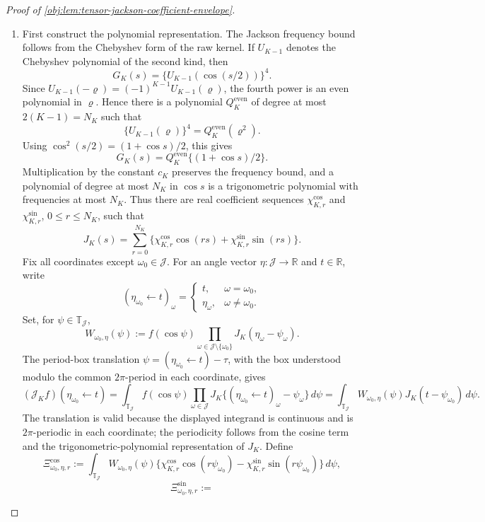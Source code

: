 \begin{proof}[Proof of \cref{obj:lem:tensor-jackson-coefficient-envelope}]
\begin{enumerate}
\item
First construct the polynomial representation.  The Jackson frequency bound follows from the Chebyshev form of the raw kernel.  If \(U_{K-1}\) denotes the Chebyshev polynomial of the second kind, then
\[
G_K(s)=\{U_{K-1}(\cos(s/2))\}^{4}.
\]
Since \(U_{K-1}(-\varrho)=(-1)^{K-1}U_{K-1}(\varrho)\), the fourth power is an even polynomial in \(\varrho\).  Hence there is a polynomial \(Q_K^{\mathrm{even}}\) of degree at most \(2(K-1)=N_K\) such that
\[
\{U_{K-1}(\varrho)\}^{4}=Q_K^{\mathrm{even}}(\varrho^2).
\]
Using \(\cos^2(s/2)=(1+\cos s)/2\), this gives
\[
G_K(s)=Q_K^{\mathrm{even}}\{(1+\cos s)/2\}.
\]
Multiplication by the constant \(c_K\) preserves the frequency bound, and a polynomial of degree at most \(N_K\) in \(\cos s\) is a trigonometric polynomial with frequencies at most \(N_K\).  Thus there are real coefficient sequences \(\chi^{\cos}_{K,r}\) and \(\chi^{\sin}_{K,r}\), \(0\le r\le N_K\), such that
\[
J_K(s)=\sum_{r=0}^{N_K}
\{\chi^{\cos}_{K,r}\cos(rs)+\chi^{\sin}_{K,r}\sin(rs)\}.
\]
Fix all coordinates except \(\omega_0\in\mathcal J\).  For an angle vector \(\eta:\mathcal J\to\mathbb R\) and \(t\in\mathbb R\), write
\[
(\eta_{\omega_0}\leftarrow t)_\omega
=
\begin{cases}
t,&\omega=\omega_0,\\
\eta_\omega,&\omega\ne\omega_0.
\end{cases}
\]
Set, for \(\psi\in\mathbb T_{\mathcal J}\),
\[
W_{\omega_0,\eta}(\psi)
:=
f(\cos \psi)
\prod_{\omega\in\mathcal J\setminus\{\omega_0\}}
J_K(\eta_\omega-\psi_\omega).
\]
The period-box translation \(\psi=(\eta_{\omega_0}\leftarrow t)-\tau\), with the box understood modulo the common \(2\pi\)-period in each coordinate, gives
\[
(\mathcal J_K f)(\eta_{\omega_0}\leftarrow t)
=
\int_{\mathbb T_{\mathcal J}}
f(\cos\psi)
\prod_{\omega\in\mathcal J}
J_K\{(\eta_{\omega_0}\leftarrow t)_\omega-\psi_\omega\}\,d\psi
=
\int_{\mathbb T_{\mathcal J}}
W_{\omega_0,\eta}(\psi)J_K(t-\psi_{\omega_0})\,d\psi .
\]
The translation is valid because the displayed integrand is continuous and is \(2\pi\)-periodic in each coordinate; the periodicity follows from the cosine term and the trigonometric-polynomial representation of \(J_K\). %
Define
\[
\Xi^{\cos}_{\omega_0,\eta,r}
:=
\int_{\mathbb T_{\mathcal J}}
W_{\omega_0,\eta}(\psi)
\{\chi^{\cos}_{K,r}\cos(r\psi_{\omega_0})-\chi^{\sin}_{K,r}\sin(r\psi_{\omega_0})\}\,d\psi,
\]
\[
\Xi^{\sin}_{\omega_0,\eta,r}
:=
\]
\end{enumerate}
\end{proof}
